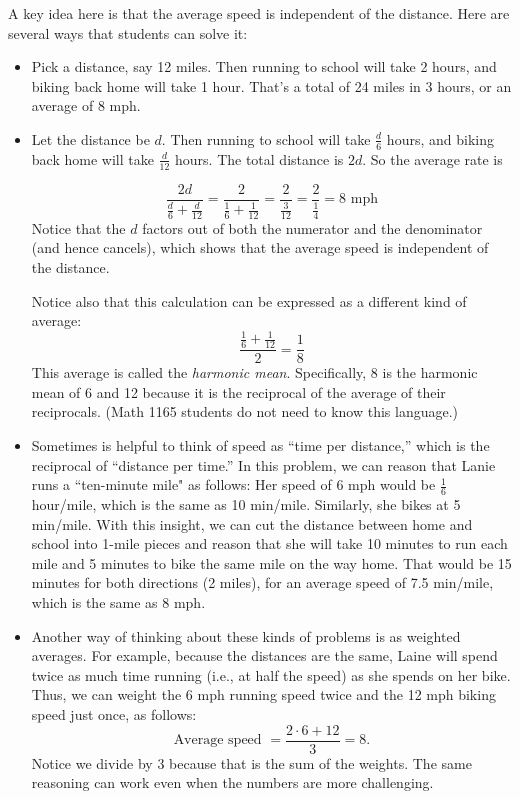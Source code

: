 \documentclass{ximera}
\begin{document}
\begin{teachingnote}
A key idea here is that the average speed is independent of the distance.  Here are several ways that students can solve it: 
\begin{itemize}
\item Pick a distance, say 12 miles.  Then running to school will take 2 hours, and biking back home will take 1 hour.  That's a total of 24 miles in 3 hours, or an average of 8 mph.  
\item Let the distance be $d$.  Then running to school will take $\frac{d}{6}$ hours, and biking back home will take $\frac{d}{12}$ hours.  The total distance is $2d$.  So the average rate is 

$$\frac{2d}{\frac{d}{6}+\frac{d}{12}}=\frac{2}{\frac{1}{6}+\frac{1}{12}}=\frac{2}{\frac{3}{12}}=\frac{2}{\frac{1}{4}}=8 \text{ mph}$$
Notice that the $d$ factors out of both the numerator and the denominator (and hence cancels), which shows that the average speed is independent of the distance.  

Notice also that this calculation can be expressed as a different kind of average:  $$\frac{\frac{1}{6}+\frac{1}{12}}{2}=\frac{1}{8}$$
This average is called the \emph{harmonic mean}.  Specifically, 8 is the harmonic mean of 6 and 12 because it is the reciprocal of the average of their reciprocals.  (Math 1165 students do not need to know this language.)
\item Sometimes is helpful to think of speed as ``time per distance,'' which is the reciprocal of ``distance per time.''  In this problem, we can reason that Lanie runs a ``ten-minute mile" as follows:  Her speed of 6 mph would be $\frac{1}{6}$ hour/mile, which is the same as 10 min/mile.  Similarly, she bikes at 5 min/mile.  With this insight, we can cut the distance between home and school into 1-mile pieces and reason that she will take 10 minutes to run each mile and 5 minutes to bike the same mile on the way home.  That would be 15 minutes for both directions (2 miles), for an average speed of 7.5 min/mile, which is the same as 8 mph.  
\item Another way of thinking about these kinds of problems is as weighted averages.  For example, because the distances are the same, Laine will spend twice as much time running (i.e., at half the speed) as she spends on her bike.  Thus, we can weight the 6 mph running speed twice and the 12 mph biking speed just once, as follows:  
$$\textrm{Average speed }= \frac{2\cdot6 + 12}{3} = 8.$$
Notice we divide by 3 because that is the sum of the weights.  The same reasoning can work even when the numbers are more challenging.  
\end{itemize}
\end{teachingnote}
\end{document}
